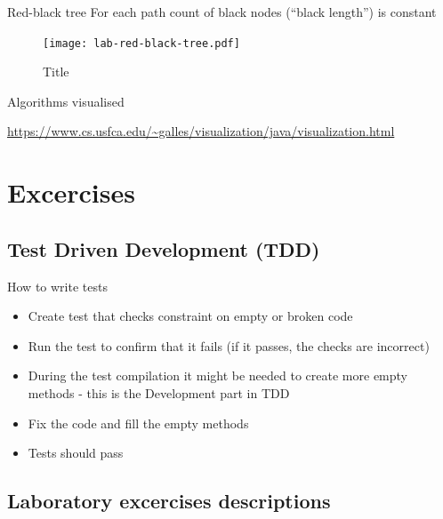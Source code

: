 \documentclass{beamer}
\begin{document}
\begin{frame}{Red-black tree}
    For each path count of black nodes (``black length'') is constant
    \begin{figure}[htbp]
    \centering
        \texttt{[image: lab-red-black-tree.pdf]}
    \caption{Title}
    \label{fig:lab_red_black_tree}
    \end{figure}

\end{frame}

\begin{frame}{Algorithms visualised}
\begin{center}
    \url{https://www.cs.usfca.edu/~galles/visualization/java/visualization.html}
\end{center}
\end{frame}

\section{Excercises}
\subsection{Test Driven Development (TDD)}
\begin{frame}{How to write tests}
    \begin{itemize}
        \item Create test that checks constraint on empty or broken code
        \item Run the test to confirm that it fails (if it passes, the checks are incorrect)
        \item During the test compilation it might be needed to create more empty methods - this is the Development part in TDD
        \item Fix the code and fill the empty methods
        \item Tests should pass
    \end{itemize}
\end{frame}

\subsection{Laboratory excercises descriptions}
\end{document}
